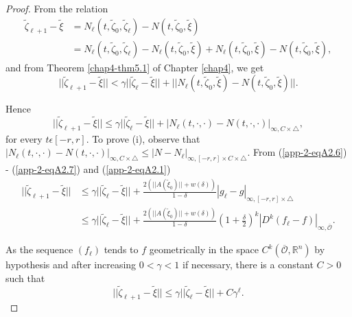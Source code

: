 \begin{proof}
From the relation
\begin{align*}
 \widetilde{\zeta}_{\ell + 1} -  \widetilde{\xi} & = N_{\ell}(t,
 \widetilde{\zeta}_{0},  \widetilde{\zeta}_{\ell}) - N(t,
 \widetilde{\zeta}_{0},  \widetilde{\xi})\\
& = N_{\ell} (t,  \widetilde{\zeta}_{0},  \widetilde{\zeta}_{\ell}) -
 N_{\ell} (t,  \widetilde{\zeta}_{0},  \widetilde{\xi}) + N_{\ell}(t,
 \widetilde{\zeta}_{0},  \widetilde{\xi}) - N(t,
 \widetilde{\zeta}_{0},  \widetilde{\xi}),
\end{align*}
and from Theorem \ref{chap4-thm5.1} of Chapter \ref{chap4}, we get
$$
|| \widetilde{\zeta}_{\ell + 1} -  \widetilde{\xi}|| < \gamma ||
\widetilde{\zeta}_{\ell} -  \widetilde{\xi}|| + ||N_{\ell} (t,
\widetilde{\zeta}_{0},  \widetilde{\xi}) - N(t,
\widetilde{\zeta}_{0},  \widetilde{\xi})||.
$$

Hence
\begin{equation*}
|| \widetilde{\zeta}_{\ell + 1} -  \widetilde{\xi}|| \leq \gamma ||
\widetilde{\zeta}_{\ell} -  \widetilde{\xi}|| + |N_{\ell}(t, \cdot,
\cdot) - N (t, \cdot, \cdot)|_{\infty, C \times \triangle},\tag{A2.23}\label{app-2-eqA2.23}
\end{equation*}
for every $t \epsilon [-r, r]$. To prove (i), observe that
$|N_{\ell} (t, \cdot, \cdot) - N (t, \cdot, \cdot)|_{\infty, C \times
  \triangle} \leq |N - N_{\ell}|_{\infty, [-r, r] \times C \times
  \triangle}$. From (\ref{app-2-eqA2.6}) - (\ref{app-2-eqA2.7}) and (\ref{app-2-eqA2.1})
\begin{align*}
|| \widetilde{\zeta}_{\ell + 1} -  \widetilde{\xi}|| & \leq \gamma ||
\widetilde{\zeta}_{\ell} -  \widetilde{\xi}|| + \frac{2(||A(
  \widetilde{\xi}_{0})|| + w(\delta))}{1 - \delta} |g_{\ell} -
g|_{\infty, [-r, r] \times \triangle}\\
& \leq \gamma || \widetilde{\zeta}_{\ell} -  \widetilde{\xi}|| +
\frac{2(||A( \widetilde{\xi}_{0})|| + w(\delta))}{1 - \delta} \left(1
+ \frac{\delta}{2}\right)^{k} |D^{k}(f_{\ell} - f)|_{\infty,
  \overline{\mathscr{O}}}. 
\end{align*}

As the sequence $(f_{\ell})$ tends to $f$ geometrically in the space
$C^{k} (\overline{\mathscr{O}}, \mathbb{R}^{n})$ by hypothesis and
after increasing $0 < \gamma < 1$ if necessary, there is a constant $C
> 0$ such that
$$
|| \widetilde{\zeta}_{\ell + 1} -  \widetilde{\xi}|| \leq \gamma ||
\widetilde{\zeta}_{\ell} -  \widetilde{\xi}|| + C \gamma^{\ell}.
$$


\end{proof}
